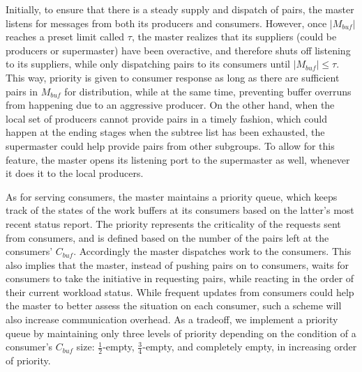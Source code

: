 \documentclass[10pt,journal,letterpaper,compsoc]{IEEEtran}
\begin{document}
Initially, to ensure that there is a steady supply and dispatch of pairs, the master listens for messages from both its producers and consumers. However, once $|M_{buf}|$ reaches a preset limit called $\tau$, the master realizes that its suppliers (could be producers or supermaster) have been overactive, and therefore shuts off listening to its suppliers, while only dispatching pairs to its consumers until $|M_{buf}|\leq\tau$. This way, priority is given to consumer response as long as there are sufficient pairs in $M_{buf}$ for distribution, while at the same time, preventing buffer overruns from happening due to an aggressive producer. 
On the other hand, when the local set of producers cannot provide pairs in a timely fashion, which could happen at the ending stages when the subtree list has been exhausted, the supermaster could help provide pairs from other subgroups. To allow for this feature, the master opens its listening port to the supermaster as well, whenever it does it to the local producers.

As for serving consumers, the master maintains a priority queue, which keeps track of the states of the work buffers at its consumers based on the latter's most recent status report.  The priority represents the criticality of the requests sent from consumers, and is defined based on the number of the pairs left at the consumers' $C_{buf}$. Accordingly the master dispatches work to the consumers. 
This also implies that the master, instead of pushing pairs on to consumers, waits for consumers to take the initiative in requesting pairs, while reacting in the order of their current workload status. 
While frequent updates from consumers could help the master to better assess the situation on each consumer, such a scheme will also increase communication overhead. As a tradeoff, we implement a priority queue by maintaining only three levels of priority depending on the condition of a consumer's $C_{buf}$ size: $\frac{1}{2}$-empty, $\frac{3}{4}$-empty, and completely empty, in increasing order of priority. \\
\end{document}
